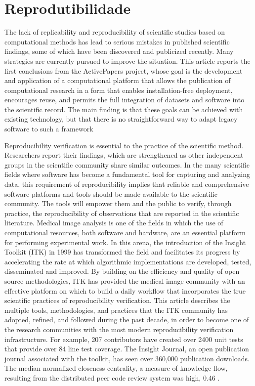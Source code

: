 \section{Reprodutibilidade}


The lack of replicability and reproducibility of scientific studies based on
computational methods has lead to serious mistakes in published scientific
findings, some of which have been discovered and publicized recently. Many
strategies are currently pursued to improve the situation. This article reports the
first conclusions from the ActivePapers project, whose goal is the development
and application of a computational platform that allows the publication of
computational research in a form that enables installation-free deployment,
encourages reuse, and permits the full integration of datasets and software into
the scientific record. The main finding is that these goals can be achieved with
existing technology, but that there is no straightforward way to adapt legacy
software to such a framework \cite{hinsen2014activepapers}

Reproducibility verification is essential to the practice of the scientific method.
Researchers report their findings, which are strengthened as other independent groups
in the scientific community share similar outcomes. In the many scientific fields
where software has become a fundamental tool for capturing and analyzing data, this
requirement of reproducibility implies that reliable and comprehensive software platforms
and tools should be made available to the scientific community. The tools will empower
them and the public to verify, through practice, the reproducibility of observations that
are reported in the scientific literature. Medical image analysis is one of the fields in
which the use of computational resources, both software and hardware, are an essential
platform for performing experimental work. In this arena, the introduction of the Insight
Toolkit (ITK) in 1999 has transformed the field and facilitates its progress by accelerating
the rate at which algorithmic implementations are developed, tested, disseminated and
improved. By building on the efficiency and quality of open source methodologies, ITK has
provided the medical image community with an effective platform on which to build a daily
workflow that incorporates the true scientific practices of reproducibility verification. This
article describes the multiple tools, methodologies, and practices that the ITK community
has adopted, refined, and followed during the past decade, in order to become one of the
research communities with the most modern reproducibility verification infrastructure. For
example, 207 contributors have created over 2400 unit tests that provide over 84%
line test coverage. The Insight Journal, an open publication journal associated with the
toolkit, has seen over 360,000 publication downloads. The median normalized closeness
centrality, a measure of knowledge flow, resulting from the distributed peer code review
system was high, 0.46 \cite{McCormick2014}.

